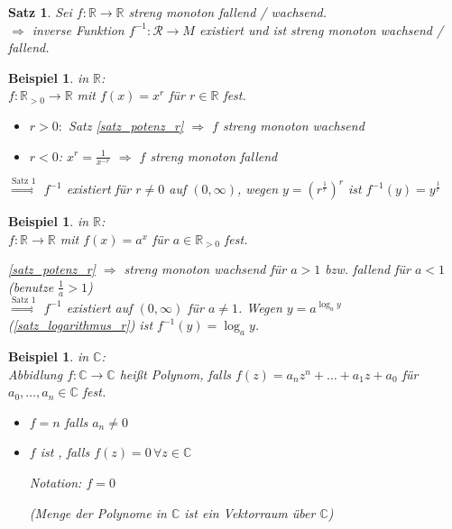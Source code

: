 \documentclass[ngerman,a4paper]{report}
\theoremstyle{break}
\newtheorem{example}[theorem]{Beispiel}
\newtheorem{satz}[theorem]{Satz}
\newcommand{\highlight}[1]{\emph{#1}}
\begin{document}
\begin{satz}
	Sei $f:\mathbb{R}\rightarrow \mathbb{R}$ streng monoton fallend / wachsend.\\
	$\Rightarrow$ inverse Funktion $f^{-1}:\mathcal{R}\rightarrow M$ existiert und ist streng monoton wachsend / fallend.
\end{satz}
\begin{example}
	 in $\mathbb{R}$:\\
	$f:\mathbb{R}_{>0} \to \mathbb{R}$ mit $f(x) = x^r$ für $r\in\mathbb{R}$ fest.
	
	\begin{itemize}
		\item $r > 0:$ Satz \ref{satz_potenz_r} $\Rightarrow$ $f$ streng monoton wachsend
		\item $r < 0$: $x^r = \frac{1}{x^{-r}}$ $\Rightarrow$ $f$ streng monoton fallend
	\end{itemize}
	$\overset{\text{Satz 1}}{\Rightarrow}$ $f^{-1}$ existiert für $r\neq 0$ auf $(0,\infty)$, wegen $ y = (r^{\frac{1}{r}})^r$ ist $f^{-1}(y) = y^{\frac{1}{r}}$
\end{example}
\begin{example}
	 in $\mathbb{R}$:\\
	$f:\mathbb{R}\rightarrow\mathbb{R}$ mit $f(x) = a^x$ für $a\in\mathbb{R}_{>0}$ fest.
	
	\ref{satz_potenz_r} $\Rightarrow$ streng monoton wachsend für $a > 1$ bzw. fallend für $a < 1$ (benutze $\frac{1}{a} > 1$)\\
	$\overset{\text{Satz 1}}{\Rightarrow}$ $f^{-1}$ existiert auf $(0,\infty)$ für $a \neq 1$. Wegen $y = a^{\log_a y}$ (\ref{satz_logarithmus_r}) ist $f^{-1} (y) = \log_a y$.
\end{example}
\begin{example}
	 in $\mathbb{C}$:\\
	Abbidlung $f:\mathbb{C}\rightarrow\mathbb{C}$ heißt \highlight{Polynom}, falls $f(z) = a_n z^n + \dotsc + a_1 z + a_0$ für $a_0,\dotsc, a_n\in\mathbb{C}$ fest.
	\begin{itemize}
		\item {}$f = n$ falls $a_n\neq 0$
		\item $f$ ist , falls $f(z) = 0\,\forall z\in\mathbb{C}$
		
		Notation: $f=0$
		
		(Menge der Polynome in $\mathbb{C}$ ist ein Vektorraum über $\mathbb{C}$)
	\end{itemize}
\end{example}
\end{document}
